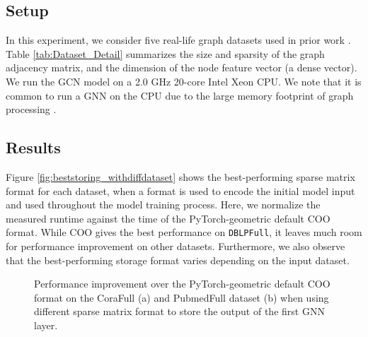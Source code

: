 \vspace{-4mm}
\subsection{Setup}
\vspace{-2mm}
In this experiment, we consider five real-life graph datasets used in prior work
\cite{bojchevski2017deep}. Table \ref{tab:Dataset_Detail} summarizes the size and sparsity of the graph adjacency matrix, and the
dimension of the node feature vector (a dense vector). We
run the GCN model on a 2.0 GHz 20-core Intel Xeon CPU. We note that it is common to run a GNN on the CPU due to the large
memory footprint of graph processing \cite{bojchevski2017deep}.

\vspace{-4mm}
\subsection{Results}
\vspace{-2mm}
Figure \ref{fig:beststoring_withdiffdataset} shows the best-performing sparse matrix format for each dataset, when a format is used to encode the initial model input and used throughout the model training process. Here, we normalize the measured runtime against the time of the PyTorch-geometric default COO format. While COO gives the best
performance on \texttt{DBLPFull}, it leaves much room for performance improvement on other datasets. Furthermore, we also observe that the best-performing storage format varies depending on the input
dataset.

\begin{figure}[t!]
\centering
{}%
%
\vspace{-3mm}
\caption{Performance improvement over the PyTorch-geometric default COO format on the CoraFull (a) and PubmedFull dataset (b) when using different sparse matrix format
to store the output of the first GNN layer.}
\label{fig:CoraFull_pubmedfull_b}
\vspace{-4mm}
\end{figure}

